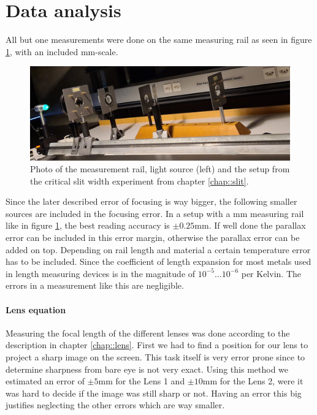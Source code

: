 \section{Data analysis}

All but one measurements were done on the same measuring rail as seen in figure \ref{fig::rail}, with an included \si{\milli \m}-scale. 
\begin{figure}[h!]
	\centering
	\includegraphics[width=\textwidth]{img/railcut.jpeg}
	\caption{Photo of the measurement rail, light source (left) and the setup from the critical slit width experiment from chapter \ref{chap::slit}.}
	\label{fig::rail}
\end{figure}

Since the later described error of focusing is way bigger, the following smaller sources are included in the focusing error.
In a setup with a \si{\milli \m} measuring rail like in figure \ref{fig::rail}, the best reading accuracy is $\pm 0.25 \si{\milli \m}$. 
If well done the parallax error can be included in this error margin, otherwise the parallax error can be added on top.
Depending on rail length and material a certain temperature error has to be included. 
Since the coefficient of length expansion for most metals used in length measuring devices is in the magnitude of $10^{-5} \dots 10^{-6}$ per Kelvin.
The errors in a measurement like this are negligible. 

\paragraph{Lens equation}
Measuring the focal length of the different lenses was done according to the description in chapter \ref{chap::lens}. 
First we had to find a position for our lens to project a sharp image on the screen.
This task itself is very error prone since to determine sharpness from bare eye is not very exact.
Using this method we estimated an error of $\pm 5$\si{\milli\m} for the Lens 1 and $\pm 10$\si{\milli\m} for the Lens 2, were it was hard to decide if the image was still sharp or not.
Having an error this big justifies neglecting the other errors which are way smaller.

